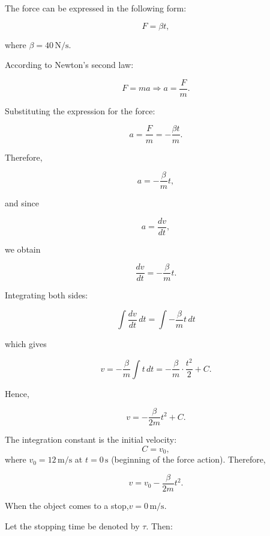 \documentclass[t,aspectratio=169]{beamer}
\begin{document}
\begin{frame}
\begin{enumerate}
\begin{center}
\end{center} 

The force can be expressed in the following form:

$$F = \beta t,$$

where $\beta = 40\,\mathrm{N/s}.$

According to Newton’s second law:

$$F = ma \Rightarrow a = \frac{F}{m}. $$

Substituting the expression for the force:

$$a = \frac{F}{m} = -\frac{\beta t}{m}. $$

\pagebreak
Therefore,

$$a = -\frac{\beta}{m} t,$$

and since

$$a = \frac{dv}{dt},$$

we obtain

$$\frac{dv}{dt} = -\frac{\beta}{m} t. $$

\pagebreak
Integrating both sides:

$$\int \frac{dv}{dt} \, dt = \int -\frac{\beta}{m} t \, dt$$

which gives

$$v = -\frac{\beta}{m} \int t \, dt = -\frac{\beta}{m} \cdot \frac{t^2}{2} + C. $$

Hence,

$$v = -\frac{\beta}{2m} t^2 + C. $$

\pagebreak
The integration constant is the initial velocity: $$C = v_0,$$where $v_0 = 12\,\mathrm{m/s}$ at $t = 0\,\mathrm{s}$ (beginning of the force action). Therefore,

$$v = v_0 - \frac{\beta}{2m} t^2. $$

When the object comes to a stop,$v = 0\,\mathrm{m/s}.$

Let the stopping time be denoted by $\tau$. Then:


\end{enumerate}
\end{frame}
\end{document}
